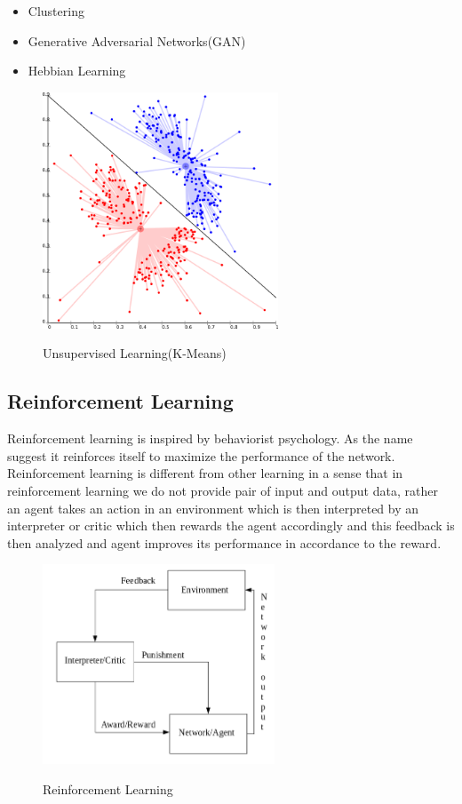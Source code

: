 \documentclass[12pt, a4paper]{report}
\begin{document}
\begin{itemize}
	\item{Clustering}
	\item{Generative Adversarial Networks(GAN)}
	\item{Hebbian Learning}
\end{itemize}
\par
\begin{figure}[h]
\centering	
\includegraphics[width=7cm]{cluster.png}\\
\caption{Unsupervised Learning(K-Means)}
\label{fig:cluster}
\end{figure} 

\subsection{Reinforcement Learning}\label{sec:ReinforcementLearning}

Reinforcement learning is inspired by behaviorist psychology. As the name suggest it reinforces itself to maximize the performance of the network. Reinforcement learning is different from other learning in a sense that in reinforcement learning we do not provide pair of input and output data, rather an agent takes an action in an environment which is then interpreted by an interpreter or critic which then rewards the agent accordingly and this feedback is then analyzed and agent improves its performance in accordance to the reward.\\ \par

\begin{figure}[h]
\centering	
\includegraphics[width=6.9cm]{reinforcement.png}\\
\caption{Reinforcement Learning}
\label{fig:reinforcement}
\end{figure} 
\end{document}
